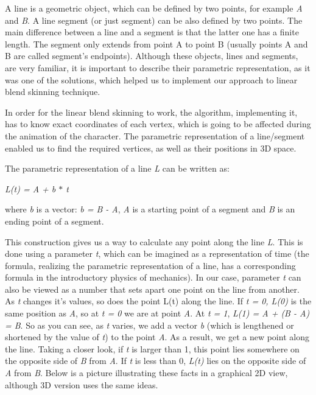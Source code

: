 \documentclass[times, 10pt,twocolumn]{article}
\begin{document}
A line is a geometric object, which can be defined by two points, for example \emph{A} and \emph{B}. A line segment (or just segment) can be also defined by two points. The main difference between a line and a segment is that the latter one has a finite length. The segment only extends from point A to point B (usually points A and B are called segment's endpoints). Although these objects, lines and segments, are very familiar, it is important to describe their parametric representation, as it was one of the solutions, which helped us to implement our approach to linear blend skinning technique.

In order for the linear blend skinning to work, the algorithm, implementing it, has to know exact coordinates of  each vertex, which is going to be affected during the animation of the character. The parametric representation of a line/segment enabled us to find the required vertices, as well as their positions in 3D space.

The parametric representation of a line \emph{L} can be written as:
\begin{center}
\emph{L(t) = A + b $\ast$ t}
\end{center}
where \emph{b} is a vector: \emph{b = B - A}, \emph{A} is a starting point of a segment and \emph{B} is an ending point of a segment.

This construction gives us a way to calculate any point along the line \emph{L}. This is done using a parameter \emph{t}, which can be imagined as a representation of time (the formula, realizing the parametric representation of a line, has a corresponding formula in the introductory physics of mechanics). In our case, parameter \emph{t} can also be viewed as a number  that sets apart one point on the line from another. As \emph{t} changes it's values, so does the point L(t)  along the line.
If \emph{t = 0, L(0)} is the same position as \emph{A}, so at \emph{t = 0} we are at point \emph{A}. At \emph{t = 1},  \emph{L(1) = A + (B - A) = B}. So as you can see, as \emph{t} varies, we add a vector \emph{b} (which is lengthened or shortened by the value of \emph{t}) to the point \emph{A}. As a result, we get a new point along the line. Taking a closer look, if \emph{t} is larger than 1, this point lies somewhere on the opposite side of \emph{B} from \emph{A}. If \emph{t} is less than 0, \emph{L(t)} lies on the opposite side of \emph{A} from \emph{B}. Below is a picture \label{line_in_space} illustrating these facts in a graphical 2D view, although 3D version uses the same ideas.
\end{document}
